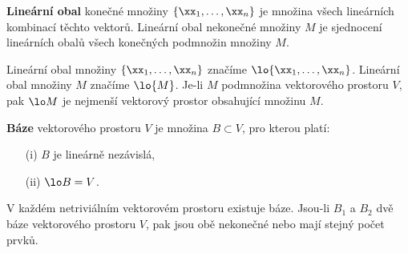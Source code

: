 \begin{df}
{\bf Lineární obal} konečné množiny $\{\xx_1,\ldots,\xx_n\}$ je množina všech lineárních kombinací těchto vektorů.
Lineární obal nekonečné množiny $M$ je sjednocení lineárních obalů všech konečných podmnožin množiny $M$.
\end{df}

Lineární obal množiny $\{\xx_1,\ldots,\xx_n\}$ značíme $\lo{\xx_1,\ldots,\xx_n}$.
Lineární obal množiny $M$ značíme $\lo{M}$.
% 
% 
% 
% 
Je-li $M$ podmnožina vektorového prostoru $V$, pak $\lo M$ je nej\-men\-ší vektorový prostor obsahující množinu $M$.


\begin{df}
{\bf Báze} vektorového prostoru $V$ je množina $B\subset V$, pro kterou platí:
\begin{itemize}
\item[(i)] $B$ je lineárně nezávislá,
\item[(ii)] $\lo B=V$.
\end{itemize}
\end{df}

\begin{veta}
V každém netriviálním vektorovém prostoru existuje báze.
Jsou-li $B_1$ a $B_2$ dvě báze vektorového prostoru $V$, pak jsou obě nekonečné nebo mají stejný počet prvků.
\end{veta}


